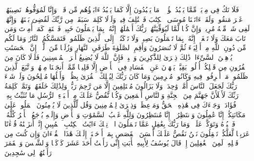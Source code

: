 فَلَا تَكُ فِی مِرۡیَةࣲ مِّمَّا یَعۡبُدُ هَٰۤؤُلَاۤءِۚ مَا یَعۡبُدُونَ إِلَّا كَمَا یَعۡبُدُ ءَابَاۤؤُهُم مِّن قَبۡلُۚ وَإِنَّا لَمُوَفُّوهُمۡ نَصِیبَهُمۡ غَیۡرَ مَنقُوصࣲ%
\stopbuffer%
\startbuffer[\q:11:110]
وَلَقَدۡ ءَاتَیۡنَا مُوسَى ٱلۡكِتَٰبَ فَٱخۡتُلِفَ فِیهِۚ وَلَوۡلَا كَلِمَةࣱ سَبَقَتۡ مِن رَّبِّكَ لَقُضِیَ بَیۡنَهُمۡۚ وَإِنَّهُمۡ لَفِی شَكࣲّ مِّنۡهُ مُرِیبࣲ%
\stopbuffer%
\startbuffer[\q:11:111]
وَإِنَّ كُلࣰّا لَّمَّا لَیُوَفِّیَنَّهُمۡ رَبُّكَ أَعۡمَٰلَهُمۡۚ إِنَّهُۥ بِمَا یَعۡمَلُونَ خَبِیرࣱ%
\stopbuffer%
\startbuffer[\q:11:112]
فَٱسۡتَقِمۡ كَمَاۤ أُمِرۡتَ وَمَن تَابَ مَعَكَ وَلَا تَطۡغَوۡا۟ۚ إِنَّهُۥ بِمَا تَعۡمَلُونَ بَصِیرࣱ%
\stopbuffer%
\startbuffer[\q:11:113]
وَلَا تَرۡكَنُوۤا۟ إِلَى ٱلَّذِینَ ظَلَمُوا۟ فَتَمَسَّكُمُ ٱلنَّارُ وَمَا لَكُم مِّن دُونِ ٱللَّهِ مِنۡ أَوۡلِیَاۤءَ ثُمَّ لَا تُنصَرُونَ%
\stopbuffer%
\startbuffer[\q:11:114]
وَأَقِمِ ٱلصَّلَوٰةَ طَرَفَیِ ٱلنَّهَارِ وَزُلَفࣰا مِّنَ ٱلَّیۡلِۚ إِنَّ ٱلۡحَسَنَٰتِ یُذۡهِبۡنَ ٱلسَّیِّءَاتِۚ ذَٰلِكَ ذِكۡرَىٰ لِلذَّٰكِرِینَ%
\stopbuffer%
\startbuffer[\q:11:115]
وَٱصۡبِرۡ فَإِنَّ ٱللَّهَ لَا یُضِیعُ أَجۡرَ ٱلۡمُحۡسِنِینَ%
\stopbuffer%
\startbuffer[\q:11:116]
فَلَوۡلَا كَانَ مِنَ ٱلۡقُرُونِ مِن قَبۡلِكُمۡ أُو۟لُوا۟ بَقِیَّةࣲ یَنۡهَوۡنَ عَنِ ٱلۡفَسَادِ فِی ٱلۡأَرۡضِ إِلَّا قَلِیلࣰا مِّمَّنۡ أَنجَیۡنَا مِنۡهُمۡۗ وَٱتَّبَعَ ٱلَّذِینَ ظَلَمُوا۟ مَاۤ أُتۡرِفُوا۟ فِیهِ وَكَانُوا۟ مُجۡرِمِینَ%
\stopbuffer%
\startbuffer[\q:11:117]
وَمَا كَانَ رَبُّكَ لِیُهۡلِكَ ٱلۡقُرَىٰ بِظُلۡمࣲ وَأَهۡلُهَا مُصۡلِحُونَ%
\stopbuffer%
\startbuffer[\q:11:118]
وَلَوۡ شَاۤءَ رَبُّكَ لَجَعَلَ ٱلنَّاسَ أُمَّةࣰ وَٰحِدَةࣰۖ وَلَا یَزَالُونَ مُخۡتَلِفِینَ%
\stopbuffer%
\startbuffer[\q:11:119]
إِلَّا مَن رَّحِمَ رَبُّكَۚ وَلِذَٰلِكَ خَلَقَهُمۡۗ وَتَمَّتۡ كَلِمَةُ رَبِّكَ لَأَمۡلَأَنَّ جَهَنَّمَ مِنَ ٱلۡجِنَّةِ وَٱلنَّاسِ أَجۡمَعِینَ%
\stopbuffer%
\startbuffer[\q:11:120]
وَكُلࣰّا نَّقُصُّ عَلَیۡكَ مِنۡ أَنۢبَاۤءِ ٱلرُّسُلِ مَا نُثَبِّتُ بِهِۦ فُؤَادَكَۚ وَجَاۤءَكَ فِی هَٰذِهِ ٱلۡحَقُّ وَمَوۡعِظَةࣱ وَذِكۡرَىٰ لِلۡمُؤۡمِنِینَ%
\stopbuffer%
\startbuffer[\q:11:121]
وَقُل لِّلَّذِینَ لَا یُؤۡمِنُونَ ٱعۡمَلُوا۟ عَلَىٰ مَكَانَتِكُمۡ إِنَّا عَٰمِلُونَ%
\stopbuffer%
\startbuffer[\q:11:122]
وَٱنتَظِرُوۤا۟ إِنَّا مُنتَظِرُونَ%
\stopbuffer%
\startbuffer[\q:11:123]
وَلِلَّهِ غَیۡبُ ٱلسَّمَٰوَٰتِ وَٱلۡأَرۡضِ وَإِلَیۡهِ یُرۡجَعُ ٱلۡأَمۡرُ كُلُّهُۥ فَٱعۡبُدۡهُ وَتَوَكَّلۡ عَلَیۡهِۚ وَمَا رَبُّكَ بِغَٰفِلٍ عَمَّا تَعۡمَلُونَ%
\stopbuffer%
\startbuffer[\q:12:1]
الۤرۚ تِلۡكَ ءَایَٰتُ ٱلۡكِتَٰبِ ٱلۡمُبِینِ%
\stopbuffer%
\startbuffer[\q:12:2]
إِنَّاۤ أَنزَلۡنَٰهُ قُرۡءَٰنًا عَرَبِیࣰّا لَّعَلَّكُمۡ تَعۡقِلُونَ%
\stopbuffer%
\startbuffer[\q:12:3]
نَحۡنُ نَقُصُّ عَلَیۡكَ أَحۡسَنَ ٱلۡقَصَصِ بِمَاۤ أَوۡحَیۡنَاۤ إِلَیۡكَ هَٰذَا ٱلۡقُرۡءَانَ وَإِن كُنتَ مِن قَبۡلِهِۦ لَمِنَ ٱلۡغَٰفِلِینَ%
\stopbuffer%
\startbuffer[\q:12:4]
إِذۡ قَالَ یُوسُفُ لِأَبِیهِ یَٰۤأَبَتِ إِنِّی رَأَیۡتُ أَحَدَ عَشَرَ كَوۡكَبࣰا وَٱلشَّمۡسَ وَٱلۡقَمَرَ رَأَیۡتُهُمۡ لِی سَٰجِدِینَ%
\stopbuffer%
